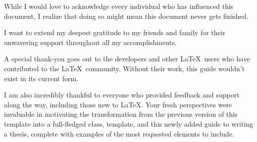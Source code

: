 While I would love to acknowledge every individual who has influenced this document, I realize that doing so might mean this document never gets finished.

I want to extend my deepest gratitude to my friends and family for their unwavering support throughout all my accomplishments.

A special thank-you goes out to the developers and other \LaTeX\ users who have contributed to the \LaTeX\ community. 
Without their work, this guide wouldn't exist in its current form.

I am also incredibly thankful to everyone who provided feedback and support along the way, including those new to \LaTeX. 
Your fresh perspectives were invaluable in motivating the transformation from the previous version of this template into a full-fledged class, template, and this newly added guide to writing a thesis, complete with examples of the most requested elements to include.